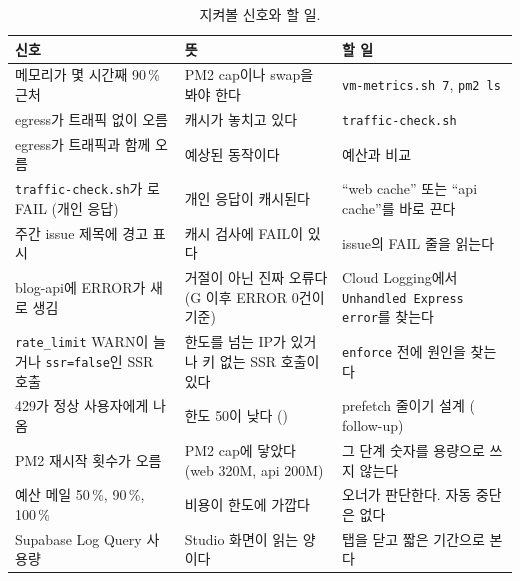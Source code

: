 \begin{table}[H]
  \caption{지켜볼 신호와 할 일.}\label{tab:08-watch}
  \footnotesize
  \begin{tabularx}{\linewidth}{L{3.6cm} Y L{3.4cm}}
    \toprule
    신호 & 뜻 & 할 일 \\
    \midrule
    메모리가 몇 시간째 90\,\% 근처 & PM2 cap이나 swap을 봐야 한다 & \texttt{vm-metrics.sh 7}, \texttt{pm2 ls} \\
    \midrule
    egress가 트래픽 없이 오름 & 캐시가 놓치고 있다 & \texttt{traffic-check.sh} \\
    \midrule
    egress가 트래픽과 함께 오름 & 예상된 동작이다 & 예산과 비교 \\
    \midrule
    \texttt{traffic-check.sh}가 로 FAIL (개인 응답) & 개인 응답이 캐시된다 & ``web cache'' 또는 ``api cache''를 바로 끈다 \\
    \midrule
    주간 issue 제목에 경고 표시 & 캐시 검사에 FAIL이 있다 & issue의 FAIL 줄을 읽는다 \\
    \midrule
    blog-api에 ERROR가 새로 생김 & 거절이 아닌 진짜 오류다 (G 이후 ERROR 0건이 기준) & Cloud Logging에서 \texttt{Unhandled Express error}를 찾는다 \\
    \midrule
    \texttt{rate\_limit} WARN이 늘거나 \texttt{ssr=false}인 SSR 호출 & 한도를 넘는 IP가 있거나 키 없는 SSR 호출이 있다 & \texttt{enforce} 전에 원인을 찾는다 \\
    \midrule
    429가 정상 사용자에게 나옴 & 한도 50이 낮다 () & prefetch 줄이기 설계 ( follow-up) \\
    \midrule
    PM2 재시작 횟수가 오름 & PM2 cap에 닿았다 (web 320M, api 200M) & 그 단계 숫자를 용량으로 쓰지 않는다 \\
    \midrule
    예산 메일 50\,\%, 90\,\%, 100\,\% & 비용이 한도에 가깝다 & 오너가 판단한다. 자동 중단은 없다 \\
    \midrule
    Supabase Log Query 사용량 & Studio 화면이 읽는 양이다 & 탭을 닫고 짧은 기간으로 본다 \\
    \bottomrule
  \end{tabularx}
\end{table}
